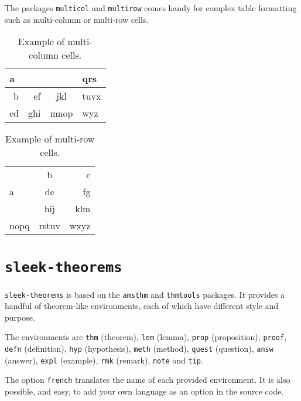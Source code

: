 \documentclass[a4paper, 12pt]{report}
\begin{document}
    The packages \texttt{multicol} and \texttt{multirow} comes handy for complex table formatting such as multi-column or multi-row cells.

    \begin{table}[H]
        \centering
        \begin{tabular}{|r|r|c|l|}
            \hline
            \multicolumn{3}{|l|}{a} & qrs  \\ \hline
             b &  ef &     jkl      & tuvx \\ \hline
            cd & ghi &     mnop     & wyz  \\ \hline
        \end{tabular}
        \caption{Example of multi-column cells.}
        \label{tab:multicol_example}
    \end{table}

    \begin{table}[H]
        \centering
        \begin{tabular}{|l|c|r|}
            \hline
            \multirow{3}{2cm}{a} &   b   &    c \\ \cline{2-3}
                                 &  de   &   fg \\ \cline{2-3}
                                 &  hij  &  klm \\ \hline
            nopq                 & rstuv & wxyz \\ \hline
        \end{tabular}
        \caption{Example of multi-row cells.}
        \label{tab:multirow_example}
    \end{table}

    \newpage

    \section{\texttt{sleek-theorems}}

    \texttt{sleek-theorems} is based on the \texttt{amsthm} and \texttt{thmtools} packages. It provides a handful of theorem-like environments, each of which have different style and purpose.

    The environments are \texttt{thm} (theorem), \texttt{lem} (lemma), \texttt{prop} (proposition), \texttt{proof}, \texttt{defn} (definition), \texttt{hyp} (hypothesis), \texttt{meth} (method), \texttt{quest} (question), \texttt{answ} (answer), \texttt{expl} (example), \texttt{rmk} (remark), \texttt{note} and \texttt{tip}.

    \begin{note}
        The option \texttt{french} translates the name of each provided environment. It is also possible, and easy, to add your own language as an option in the source code.
    \end{note}
\end{document}

